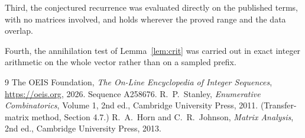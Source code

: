 \documentclass[11pt,a4paper]{article}
\theoremstyle{plain}
\theoremstyle{definition}
\begin{document}
Third, the conjectured recurrence was evaluated directly on the published terms, with no
matrices involved, and holds wherever the proved range and the data overlap.

Fourth, the annihilation test of Lemma~\ref{lem:crit} was carried out in exact integer
arithmetic on the whole vector rather than on a sampled prefix.

\begin{thebibliography}{9}
 The OEIS Foundation, \emph{The On-Line Encyclopedia of Integer
Sequences}, \url{https://oeis.org}, 2026. Sequence A258676.
 R.~P.~Stanley, \emph{Enumerative Combinatorics}, Volume 1, 2nd ed.,
Cambridge University Press, 2011. (Transfer-matrix method, Section 4.7.)
 R.~A.~Horn and C.~R.~Johnson, \emph{Matrix Analysis}, 2nd ed., Cambridge
University Press, 2013.
\end{thebibliography}
\end{document}
